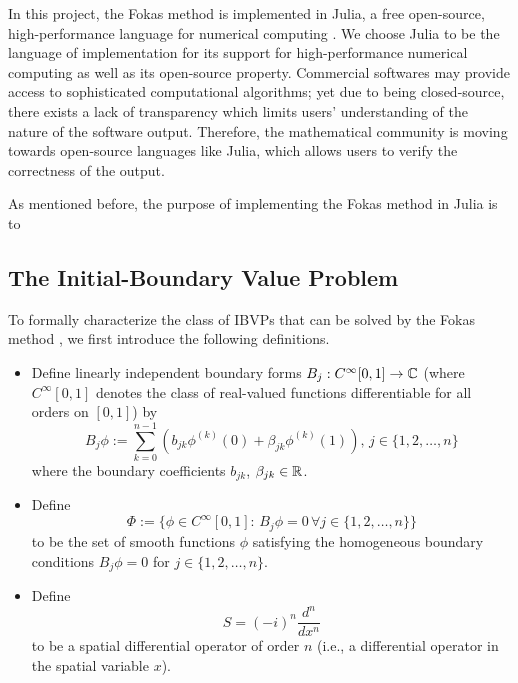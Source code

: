 \documentclass[11pt, oneside, a4paper]{article}
\begin{document}
In this project, the Fokas method is implemented in Julia, a free open-source, high-performance language for numerical computing \cite{julia}. We choose Julia to be the language of implementation for its support for high-performance numerical computing as well as its open-source property. Commercial softwares may provide access to sophisticated computational algorithms; yet due to being closed-source, there exists a lack of transparency which limits users' understanding of the nature of the software output. Therefore, the mathematical community is moving towards open-source languages like Julia, which allows users to verify the correctness of the output.

As mentioned before, the purpose of implementing the Fokas method in Julia is to 

\subsection{The Initial-Boundary Value Problem}
To formally characterize the class of IBVPs that can be solved by the Fokas method \cite[p.9]{Smith2016}, we first introduce the following definitions.
\begin{itemize}
    \item Define linearly independent boundary forms $B_j: C^\infty[0,1]\to \mathbb C$ (where $C^\infty[0,1]$ denotes the class of real-valued functions differentiable for all orders on $[0,1]$) by
    \[B_j\phi := \sum_{k=0}^{n-1}\left(b_{jk}\phi^{(k)}(0) + \beta_{jk}\phi^{(k)}(1)\right),\, j\in\{1,2,\ldots,n\}\]
    where the boundary coefficients $b_{jk}$, $\beta_{jk}\in\mathbb R$. 
    \item Define
    \[\Phi:=\{\phi\in C^\infty[0,1]:\, B_j\phi = 0\,\forall j\in\{1,2,\ldots,n\}\}\]
    to be the set of smooth functions $\phi$ satisfying the homogeneous boundary conditions $B_j\phi=0$ for $j\in\{1,2,\ldots,n\}$.
    \item Define 
    \[S = (-i)^n \frac{d^n}{dx^n}\]
    to be a spatial differential operator of order $n$ (i.e., a differential operator in the spatial variable $x$).
\end{itemize}
\end{document}
